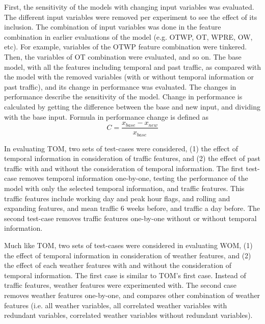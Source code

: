 First, the sensitivity of the models with changing input variables was evaluated. The different input variables were removed per experiment to see the effect of its inclusion. The combination of input variables was done in the feature combination in earlier evaluations of the model (e.g. OTWP, OT, WPRE, OW, etc). For example, variables of the OTWP feature combination were tinkered. Then, the variables of OT combination were evaluated, and so on. The base model, with all the features including temporal and past traffic, as compared with the model with the removed variables (with or without temporal information or past traffic), and its change in performance was evaluated. The changes in performance describe the sensitivity of the model. Change in performance is calculated by getting the difference between the base and new input, and dividing with the base input. Formula in performance change is defined as
\begin{equation}
C = \frac{x_{base} - x_{new}}{x_{base}}
\end{equation}

In evaluating TOM, two sets of test-cases were considered, (1) the effect of temporal information in consideration of traffic features, and (2) the effect of past traffic with and without the consideration of temporal information. The first test-case removes temporal information one-by-one, testing the performance of the model with only the selected temporal information, and traffic features. This traffic features include working day and peak hour flags, and rolling and expanding features, and mean traffic 6 weeks before, and traffic a day before. The second test-case removes traffic features one-by-one without or without temporal information. 

Much like TOM, two sets of test-cases were considered in evaluating WOM, (1) the effect of temporal information in consideration of weather features, and (2) the effect of each weather features with and without the consideration of temporal information. The first case is similar to TOM's first case. Instead of traffic features, weather features were experimented with. The second case removes weather features one-by-one, and compares other combination of weather features (i.e. all weather variables, all correlated weather variables with redundant variables, correlated weather variables without redundant variables).


